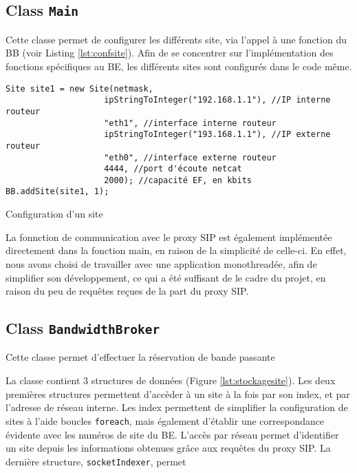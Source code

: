 \documentclass[a4paper,11pt]{article}
\let\Oldsubsection\subsection
\renewcommand{\subsection}{\FloatBarrier\Oldsubsection}
\begin{document}
\subsection{Class \texttt{Main}}

Cette classe permet de configurer les différents site, via l'appel à une fonction du BB (voir Listing \ref{lst:confsite}). Afin de se concentrer sur l'implémentation des fonctions spécifiques au BE, les différents sites sont configurés dans le code même.

\begin{listing}[htp]
    \begin{verbatim}
Site site1 = new Site(netmask,
                    ipStringToInteger("192.168.1.1"), //IP interne routeur
                    "eth1", //interface interne routeur
                    ipStringToInteger("193.168.1.1"), //IP externe routeur
                    "eth0", //interface externe routeur
                    4444, //port d'écoute netcat
                    2000); //capacité EF, en kbits
BB.addSite(site1, 1);
  \end{verbatim}
    \caption{Configuration d'un site}
    \label{lst:confsite}
\end{listing}

La fonnction de communication avec le proxy SIP est également implémentée directement dans la fonction main, en raison de la simplicité de celle-ci. En effet, nous avons choisi de travailler avec une application monothreadée,  afin de simplifier son développement, ce qui a été suffisant de le cadre du projet, en raison du peu de requêtes reçues de la part du proxy SIP.

\subsection{Class \texttt{BandwidthBroker}}

Cette classe permet d'effectuer la réservation de bande passante

La classe contient 3 structures de données (Figure \ref{lst:stockagesite}). Les deux premières structures permettent d'accèder à un site à la fois par son index, et par l'adresse de réseau interne. Les index permettent de simplifier la configuration de sites  à l'aide boucles \texttt{foreach}, mais également d'établir une correspondance évidente avec les numéros de site du BE.
L'accès par réseau permet d'identifier un site depuis les informations obtenues grâce aux requêtes du proxy SIP.
La dernière structure, \texttt{socketIndexer}, permet 
\end{document}
